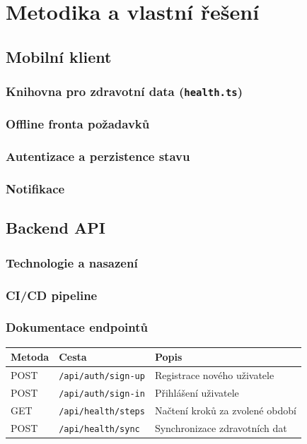 \chapter{Metodika a vlastní řešení}

\section{Mobilní klient}

\subsection{Knihovna pro zdravotní data (\texttt{health.ts})}

\subsection{Offline fronta požadavků}

\subsection{Autentizace a perzistence stavu}

\subsection{Notifikace}

\section{Backend API}

\subsection{Technologie a nasazení}

\subsection{CI/CD pipeline}

\subsection{Dokumentace endpointů}
\begin{center}
    \begin{tabular}{|l|l|p{6cm}|}
        \hline
        \textbf{Metoda} & \textbf{Cesta}             & \textbf{Popis}                  \\
        \hline
        POST            & \texttt{/api/auth/sign-up} & Registrace nového uživatele     \\
        POST            & \texttt{/api/auth/sign-in} & Přihlášení uživatele            \\
        GET             & \texttt{/api/health/steps} & Načtení kroků za zvolené období \\
        POST            & \texttt{/api/health/sync}  & Synchronizace zdravotních dat   \\
        \hline
    \end{tabular}
\end{center}